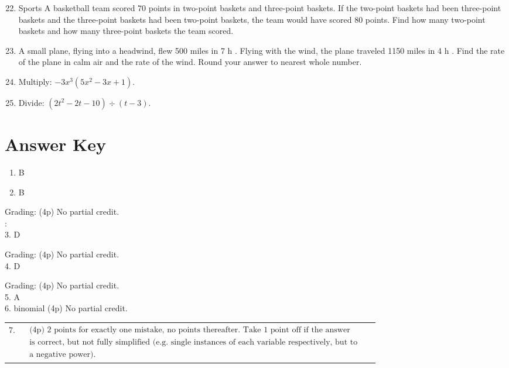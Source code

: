 \documentclass{ximera}
\begin{document}
\begin{enumerate}
  \setcounter{enumi}{21}
  \item Sports A basketball team scored 70 points in two-point baskets and three-point baskets. If the two-point baskets had been three-point baskets and the three-point baskets had been two-point baskets, the team would have scored 80 points. Find how many two-point baskets and how many three-point baskets the team scored.
  \item A small plane, flying into a headwind, flew 500 miles in 7 h . Flying with the wind, the plane traveled 1150 miles in 4 h . Find the rate of the plane in calm air and the rate of the wind. Round your answer to nearest whole number.
  \item Multiply: $-3 x^{3}\left(5 x^{2}-3 x+1\right)$.
  \item Divide: $\left(2 t^{2}-2 t-10\right) \div(t-3)$.
\end{enumerate}

\section*{Answer Key}
\begin{enumerate}
  \item B
  \item B
\end{enumerate}

Grading: (4p) No partial credit.\\
:\\
3. D

Grading: (4p) No partial credit.\\
4. D

Grading: (4p) No partial credit.\\
5. A\\
6. binomial (4p) No partial credit.

\begin{center}
\begin{tabular}{l|l|l|}
7. & $\begin{array}{l}\text { (4p) } 2 \text { points for exactly one mistake, no points thereafter. Take } 1 \text { point off if the answer } \\ \text { is correct, but not fully simplified (e.g. single instances of each variable respectively, but to } \\ \text { a negative power). }\end{array}$ \\
\end{tabular}
\end{center}
\end{document}
